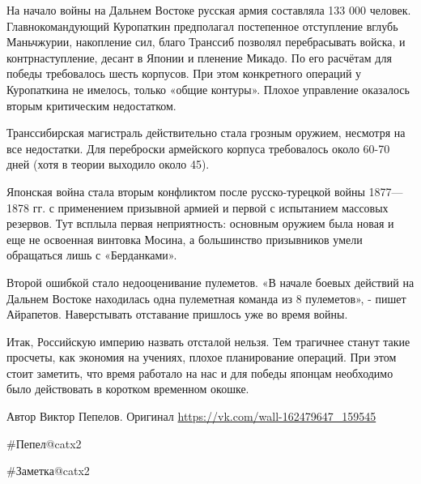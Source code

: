На начало войны на Дальнем Востоке русская армия составляла 133 000 человек. Главнокомандующий Куропаткин предполагал постепенное отступление вглубь Маньчжурии, накопление сил, благо Транссиб позволял перебрасывать войска, и контрнаступление, десант в Японии и пленение Микадо. По его расчётам для победы требовалось шесть корпусов. При этом конкретного операций у Куропаткина не имелось, только «общие контуры». Плохое управление оказалось вторым критическим недостатком.

Транссибирская магистраль действительно стала грозным оружием, несмотря на все недостатки. Для переброски армейского корпуса требовалось около 60-70 дней (хотя в теории выходило около 45).

Японская война стала вторым конфликтом после русско-турецкой войны 1877—1878 гг. с применением призывной армией и первой с испытанием массовых резервов. Тут всплыла первая неприятность: основным оружием была новая и еще не освоенная винтовка Мосина, а большинство призывников умели обращаться лишь с «Берданками».

Второй ошибкой стало недооценивание пулеметов. «В начале боевых действий на Дальнем Востоке находилась одна пулеметная команда из 8 пулеметов», - пишет Айрапетов. Наверстывать отставание пришлось уже во время войны.

Итак, Российскую империю назвать отсталой нельзя. Тем трагичнее станут такие просчеты, как экономия на учениях, плохое планирование операций. При этом стоит заметить, что время работало на нас и для победы японцам необходимо было действовать в коротком временном окошке.


Автор Виктор Пепелов. Оригинал \url{https://vk.com/wall-162479647_159545}

\#Пепел@catx2

\#Заметка@catx2

